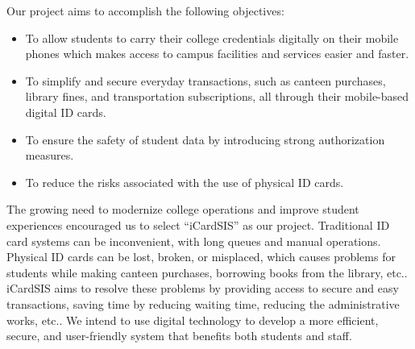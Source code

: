 \documentclass[a4paper,14pt]{article}
\begin{document}
{{{		\vspace{0.5cm}    
			{
			\noindent \normalsize
			\justifying Our project aims to accomplish the following objectives:
			\begin{itemize}
				\item To allow students to carry their college credentials digitally on their mobile phones which makes access to campus facilities and services easier and faster.
				\item To simplify and secure everyday transactions, such as canteen purchases, library fines, and transportation subscriptions, all through their mobile-based digital ID cards.
				\item To ensure the safety of student data by introducing strong authorization measures.
				\item To reduce the risks associated with the use of physical ID cards.	\end{itemize}
	    \newpage
		{
			\noindent \normalsize
			\justifying The growing need to modernize college operations and improve student experiences encouraged us to select “iCardSIS” as our project. Traditional ID card systems can be inconvenient, with long queues and manual operations. Physical ID cards can be lost, broken, or misplaced, which causes problems for students while making canteen purchases, borrowing books from the library, etc.. iCardSIS aims to resolve these problems by providing access to secure and easy transactions, saving time by reducing waiting time, reducing the administrative works, etc.. We intend to use digital technology to develop a more efficient, secure, and user-friendly system that benefits both students and staff.
			
		\vspace{0.5cm}
		
		\newpage
		
		
}}}}}
\end{document}
